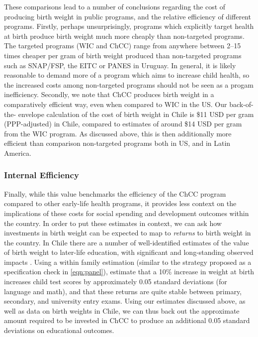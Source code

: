 \documentclass[12pt]{article}
\begin{document}
\begin{spacing}{1.4}
These comparisons lead to a number of conclusions regarding the cost of
producing birth weight in public programs, and the relative efficiency
of different programs.  Firstly, perhaps unsurprisingly, programs which
explicitly target health at birth produce birth weight much more cheaply
than non-targeted programs.  The targeted programs (WIC and ChCC) range
from anywhere between 2--15 times cheaper per gram of birth weight
produced than non-targeted programs such as SNAP/FSP, the EITC or PANES
in Uruguay.  In general, it is likely reasonable to demand more of a
program which aims to increase child health, so the increased costs
among non-targeted programs should not be seen as a progam inefficiency.
Secondly, we note that ChCC produces birth weight in a comparatively
efficient way, even when compared to WIC in the US. Our back-of-the-%
envelope calculation of the cost of birth weight in Chile is
\$11 USD per gram (PPP-adjusted) in Chile, compared to estimates of
around \$14 USD per gram from the WIC program.  As discussed above,
this is then additionally more efficient than comparison non-targeted
programs both in US, and in Latin America.

\subsubsection{Internal Efficiency}
Finally, while this value benchmarks the efficiency of the ChCC program
compared to other early-life health programs, it provides less context on
the implications of these costs for social spending and development
outcomes within the country. In order to put these estimates in context,
we can ask how investments in birth weight can be expected to map to
\emph{returns} to birth weight in the country.  In Chile there are a number
of well-identified estimates of the value of birth weight to later-life
education, with significant and long-standing observed impacts
\citet{Bharadwajetal2013,Bharadwajetal2017}.  Using a within family
estimation (similar to the strategy proposed as a specification check in
\ref{eqn:panel}), \citet{Bharadwajetal2017} estimate that a 10\% increase
in weight at birth increases child test scores by approximately 0.05
standard deviations (for language and math), and that these returns are
quite stable between primary, secondary, and university entry exams. Using
our estimates discussed above, as well as data on birth weights in Chile,
we can thus back out the approximate amount required to be invested in ChCC
to produce an additional 0.05 standard deviations on educational outcomes.


\end{spacing}
\end{document}
